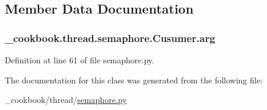 \subsection{Member Data Documentation}
\hypertarget{class__cookbook_1_1thread_1_1semaphore_1_1Cusumer_a7be67094634603b1b2a555144ad0c9aa}{
\subsubsection[{arg}]{\setlength{\rightskip}{0pt plus 5cm}\-\_\-cookbook.\-thread.\-semaphore.\-Cusumer.\-arg}}\label{class__cookbook_1_1thread_1_1semaphore_1_1Cusumer_a7be67094634603b1b2a555144ad0c9aa}


Definition at line 61 of file semaphore.\-py.



The documentation for this class was generated from the following file\-:\begin{DoxyCompactItemize}
\item 
\-\_\-cookbook/thread/\hyperlink{semaphore_8py}{semaphore.\-py}\end{DoxyCompactItemize}
